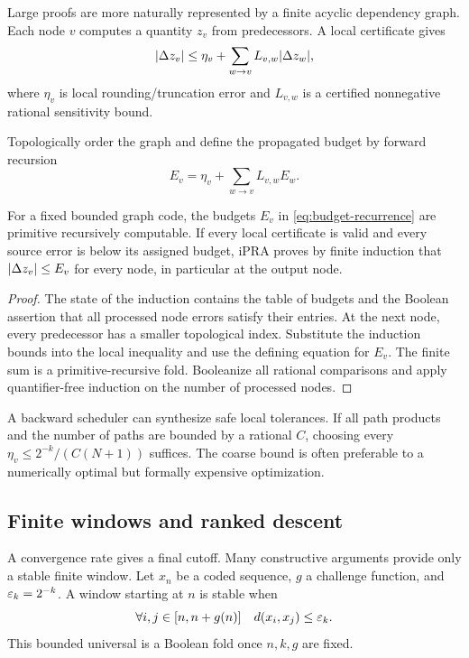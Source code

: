 Large proofs are more naturally represented by a finite acyclic dependency graph.  Each node $v$ computes a quantity $z_v$ from predecessors.  A local certificate gives
\[
  \lvert \Delta z_v\rvert\le \eta_v+
  \sum_{w\to v}L_{v,w}\lvert \Delta z_w\rvert,
\]
where $\eta_v$ is local rounding/truncation error and $L_{v,w}$ is a certified nonnegative rational sensitivity bound.

Topologically order the graph and define the propagated budget by forward recursion
\[
  E_v=\eta_v+
  \sum_{w\to v}L_{v,w}E_w.
  \tag{B}\label{eq:budget-recurrence}
\]

\begin{theorem}
\label{thm:error-dag}
For a fixed bounded graph code, the budgets $E_v$ in \eqref{eq:budget-recurrence} are primitive recursively computable.  If every local certificate is valid and every source error is below its assigned budget, iPRA proves by finite induction that $\lvert \Delta z_v\rvert\le E_v$ for every node, in particular at the output node.
\end{theorem}

\begin{proof}
The state of the induction contains the table of budgets and the Boolean assertion that all processed node errors satisfy their entries.  At the next node, every predecessor has a smaller topological index.  Substitute the induction bounds into the local inequality and use the defining equation for $E_v$.  The finite sum is a primitive-recursive fold.  Booleanize all rational comparisons and apply quantifier-free induction on the number of processed nodes.
\end{proof}

A backward scheduler can synthesize safe local tolerances.  If all path products and the number of paths are bounded by a rational $C$, choosing every $\eta_v\le2^{-k}/(C(N+1))$ suffices.  The coarse bound is often preferable to a numerically optimal but formally expensive optimization.

\subsection{Finite windows and ranked descent}

A convergence rate gives a final cutoff.  Many constructive arguments provide only a stable finite window.  Let $x_n$ be a coded sequence, $g$ a challenge function, and $\varepsilon_k=2^{-k}$.  A window starting at $n$ is stable when
\[
  \forall i,j\in[n,n+g(n)]\quad d(x_i,x_j)\le\varepsilon_k.
\]
This bounded universal is a Boolean fold once $n,k,g$ are fixed.

